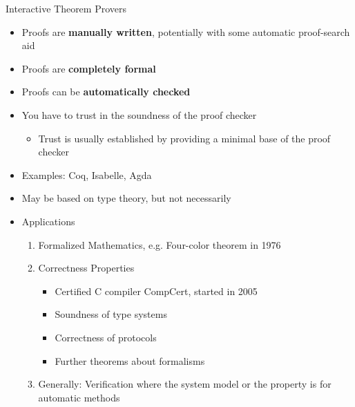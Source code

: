 \begin{frame}{Interactive Theorem Provers}
\begin{itemize}
	\item Proofs are \textbf{manually written}, potentially with some automatic proof-search aid
	\item Proofs are \textbf{completely formal}
	\item Proofs can be \textbf{automatically checked}
	\item You have to trust in the soundness of the proof checker
		\begin{itemize}
			\item Trust is usually established by providing a minimal base of the proof checker
		\end{itemize}

	\pause

	\item Examples: Coq, Isabelle, Agda
	\item May be based on type theory, but not necessarily
	\item Applications
	\begin{enumerate}
		\item Formalized Mathematics, e.g. Four-color theorem in 1976
		\item Correctness Properties
		  \begin{itemize}
			\item Certified C compiler CompCert, started in 2005
			\item Soundness of type systems
			\item Correctness of protocols
			\item Further theorems about formalisms
		  \end{itemize}
		\item Generally: Verification where the system model or the property is  for automatic methods
	\end{enumerate}
\end{itemize}
\end{frame}
